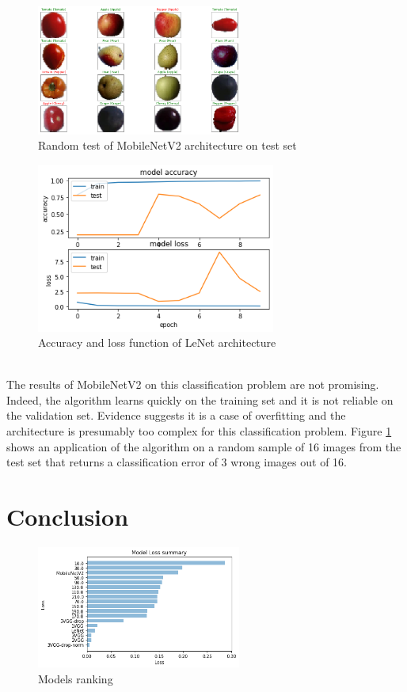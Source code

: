 \documentclass[10pt,english, openany]{book}
\begin{document}
\begin{figure}[H]
    \centering
    \includegraphics[width=0.6\textwidth]{Images/3.3. MobileNetV2 random images prediction.png}
    \caption{\label{fig:6.5}Random test of MobileNetV2 architecture on test set}
\end{figure}


\begin{figure}[H]
    \centering
    \includegraphics[width=0.7\textwidth]{Images/3.4. Accuracy Loss MobileNetv2.png}
    \caption{Accuracy and loss function of LeNet architecture}
\end{figure}
\noindent \\ The results of MobileNetV2 on this classification problem are not promising. Indeed, the algorithm learns quickly on the training set and it is not reliable on the validation set. Evidence suggests it is a case of overfitting and the architecture is presumably too complex for this classification problem. Figure \ref{fig:6.5} shows an application of the algorithm on a random sample of 16 images from the test set that returns a classification error of 3 wrong images out of 16.

\chapter{Conclusion}\label{chapt:results}
\begin{figure}[H]
    \centering
    \includegraphics[width=0.6\textwidth]{Images/4. Models ranking.png}
    \caption{\label{fig:7.1}Models ranking}
\end{figure}
\end{document}

